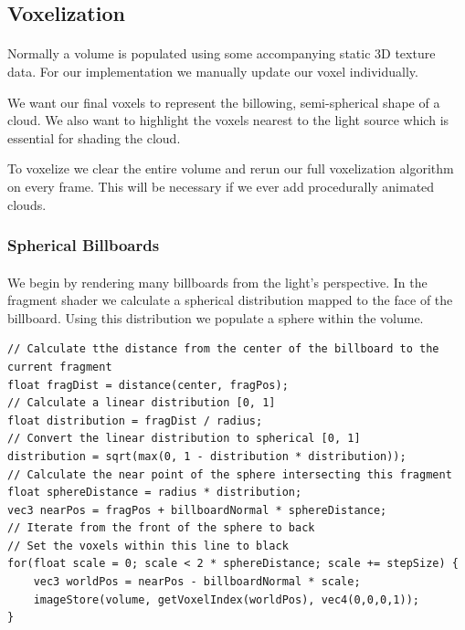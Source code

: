\subsection{Voxelization}\paragraph{}
Normally a volume is populated using some accompanying static 3D texture data. For our implementation we manually update our voxel individually. 

We want our final voxels to represent the billowing, semi-spherical shape of a cloud. We also want to highlight the voxels nearest to the light source which is essential for shading the cloud. 

To voxelize we clear the entire volume and rerun our full voxelization algorithm on every frame. This will be necessary if we ever add procedurally animated clouds. 

\subsubsection{Spherical Billboards}\paragraph{}
We begin by rendering many billboards from the light's perspective. In the fragment shader we calculate a spherical distribution mapped to the face of the billboard. Using this distribution we populate a sphere within the volume. 

\begin{lstlisting}[caption={first\_voxelize.glsl, 42}]
// Calculate tthe distance from the center of the billboard to the current fragment
float fragDist = distance(center, fragPos);
// Calculate a linear distribution [0, 1]
float distribution = fragDist / radius;
// Convert the linear distribution to spherical [0, 1]
distribution = sqrt(max(0, 1 - distribution * distribution));
// Calculate the near point of the sphere intersecting this fragment
float sphereDistance = radius * distribution;
vec3 nearPos = fragPos + billboardNormal * sphereDistance;
// Iterate from the front of the sphere to back 
// Set the voxels within this line to black
for(float scale = 0; scale < 2 * sphereDistance; scale += stepSize) {
	vec3 worldPos = nearPos - billboardNormal * scale;
	imageStore(volume, getVoxelIndex(worldPos), vec4(0,0,0,1));
}
\end{lstlisting}\paragraph{}

